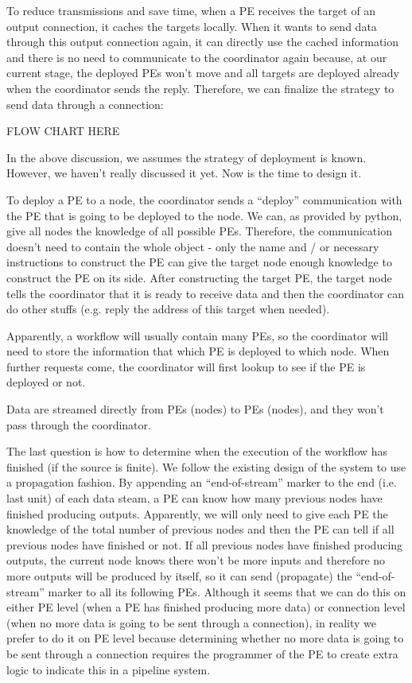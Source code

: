 \documentclass[•]{article}
\begin{document}
	To reduce transmissions and save time, when a PE receives the target of an output connection, it caches the targets locally. When it wants to send data through this output connection again, it can directly use the cached information and there is no need to communicate to the coordinator again because, at our current stage, the deployed PEs won't move and all targets are deployed already when the coordinator sends the reply. Therefore, we can finalize the strategy to send data through a connection:
	
	FLOW CHART HERE
	
	In the above discussion, we assumes the strategy of deployment is known. However, we haven't really discussed it yet. Now is the time to design it.
	
	To deploy a PE to a node, the coordinator sends a ``deploy'' communication with the PE that is going to be deployed to the node. We can, as provided by python, give all nodes the knowledge of all possible PEs. Therefore, the communication doesn't need to contain the whole object - only the name and / or necessary instructions to construct the PE can give the target node enough knowledge to construct the PE on its side. After constructing the target PE, the target node tells the coordinator that it is ready to receive data and then the coordinator can do other stuffs (e.g. reply the address of this target when needed).
	
	Apparently, a workflow will usually contain many PEs, so the coordinator will need to store the information that which PE is deployed to which node. When further requests come, the coordinator will first lookup to see if the PE is deployed or not.
	
	Data are streamed directly from PEs (nodes) to PEs (nodes), and they won't pass through the coordinator.

	The last question is how to determine when the execution of the workflow has finished (if the source is finite). We follow the existing design of the system to use a propagation fashion. By appending an ``end-of-stream'' marker to the end (i.e. last unit) of each data steam, a PE can know how many previous nodes have finished producing outputs. Apparently, we will only need to give each PE the knowledge of the total number of previous nodes and then the PE can tell if all previous nodes have finished or not. If all previous nodes have finished producing outputs, the current node knows there won't be more inputs and therefore no more outputs will be produced by itself, so it can send (propagate) the ``end-of-stream'' marker to all its following PEs. Although it seems that we can do this on either PE level (when a PE has finished producing more data) or connection level (when no more data is going to be sent through a connection), in reality we prefer to do it on PE level because determining whether no more data is going to be sent through a connection requires the programmer of the PE to create extra logic to indicate this in a pipeline system.
\end{document}
